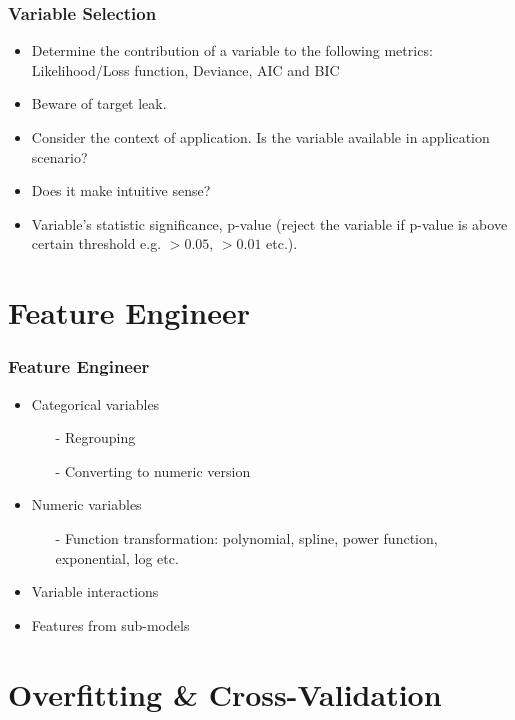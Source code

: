 \documentclass[notheorems, aspectratio=54]{beamer}
\begin{document}
\begin{frame}
\frametitle{Variable Selection}
\begin{itemize}
\item Determine the contribution of a variable to the following metrics: Likelihood/Loss function, Deviance, AIC and BIC
\item Beware of target leak.
\item Consider the context of application. Is the variable available in application scenario?
\item Does it make intuitive sense?
\item Variable's statistic significance, p-value (reject the variable if p-value is above certain threshold e.g. $>0.05$, $>0.01$ etc.).
\end{itemize}
\end{frame}

\section{Feature Engineer}
\begin{frame}
\frametitle{Feature Engineer}
\begin{itemize}
\item Categorical variables
      \begin{itemize}
        \item[-] Regrouping
        \item[-] Converting to numeric version
      \end{itemize}
\item Numeric variables
      \begin{itemize}
        \item[-] Function transformation: polynomial, spline, power function, exponential, log etc.
      \end{itemize}
      
\item Variable interactions
\item Features from sub-models
\end{itemize}
\end{frame}

\section{Overfitting \& Cross-Validation}
\end{document}
